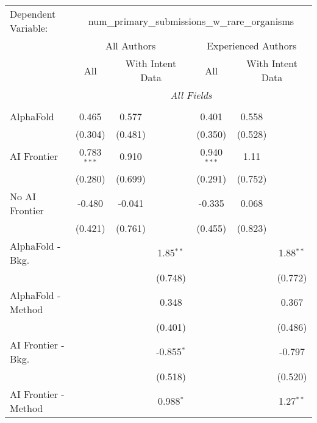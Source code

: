 \begingroup
\centering
\begin{tabular}{lcccccc}
   \tabularnewline \midrule \midrule
   Dependent Variable: & \multicolumn{6}{c}{num\_primary\_submissions\_w\_rare\_organisms}\\
 & \multicolumn{3}{c}{All Authors} & \multicolumn{3}{c}{Experienced Authors} \\
\cmidrule(lr){2-4} \cmidrule(lr){5-7}
 & \multicolumn{1}{c}{All} & \multicolumn{2}{c}{With Intent Data} & \multicolumn{1}{c}{All} & \multicolumn{2}{c}{With Intent Data} \\
\cmidrule(lr){2-2} \cmidrule(lr){3-4} \cmidrule(lr){5-5} \cmidrule(lr){6-7}
 & \multicolumn{6}{c}{\textit{All Fields}} \\ \\
   AlphaFold               & 0.465         & 0.577   &              & 0.401         & 0.558   &   \\   
                           & (0.304)       & (0.481) &              & (0.350)       & (0.528) &   \\   
   AI Frontier             & 0.783$^{***}$ & 0.910   &              & 0.940$^{***}$ & 1.11    &   \\   
                           & (0.280)       & (0.699) &              & (0.291)       & (0.752) &   \\   
   No AI Frontier          & -0.480        & -0.041  &              & -0.335        & 0.068   &   \\   
                           & (0.421)       & (0.761) &              & (0.455)       & (0.823) &   \\   
   AlphaFold - Bkg.        &               &         & 1.85$^{**}$  &               &         & 1.88$^{**}$\\   
                           &               &         & (0.748)      &               &         & (0.772)\\   
   AlphaFold - Method      &               &         & 0.348        &               &         & 0.367\\   
                           &               &         & (0.401)      &               &         & (0.486)\\   
   AI Frontier - Bkg.      &               &         & -0.855$^{*}$ &               &         & -0.797\\   
                           &               &         & (0.518)      &               &         & (0.520)\\   
   AI Frontier - Method    &               &         & 0.988$^{*}$  &               &         & 1.27$^{**}$\\   

\end{tabular}
